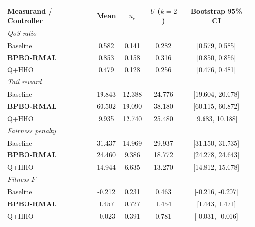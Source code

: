 \begin{tabular}{lcccc}
\hline
\textbf{Measurand / Controller} & \textbf{Mean} & \textbf{$u_c$} & \textbf{$U$ ($k{=}2$)} & \textbf{Bootstrap 95\% CI} \\
\hline
\multicolumn{5}{l}{\emph{QoS ratio}} \\
\quad Baseline & 0.582 & 0.141 & 0.282 & [0.579, 0.585] \\
\quad \textbf{BPBO-RMAL} & 0.853 & 0.158 & 0.316 & [0.850, 0.856] \\
\quad Q+HHO & 0.479 & 0.128 & 0.256 & [0.476, 0.481] \\
\hline
\multicolumn{5}{l}{\emph{Tail reward}} \\
\quad Baseline & 19.843 & 12.388 & 24.776 & [19.604, 20.078] \\
\quad \textbf{BPBO-RMAL} & 60.502 & 19.090 & 38.180 & [60.115, 60.872] \\
\quad Q+HHO & 9.935 & 12.740 & 25.480 & [9.683, 10.188] \\
\hline
\multicolumn{5}{l}{\emph{Fairness penalty}} \\
\quad Baseline & 31.437 & 14.969 & 29.937 & [31.150, 31.735] \\
\quad \textbf{BPBO-RMAL} & 24.460 & 9.386 & 18.772 & [24.278, 24.643] \\
\quad Q+HHO & 14.944 & 6.635 & 13.270 & [14.812, 15.078] \\
\hline
\multicolumn{5}{l}{\emph{Fitness $F$}} \\
\quad Baseline & -0.212 & 0.231 & 0.463 & [-0.216, -0.207] \\
\quad \textbf{BPBO-RMAL} & 1.457 & 0.727 & 1.454 & [1.443, 1.471] \\
\quad Q+HHO & -0.023 & 0.391 & 0.781 & [-0.031, -0.016] \\
\hline
\end{tabular}